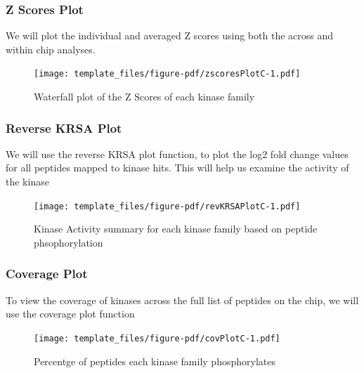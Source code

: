\documentclass[
  letterpaper,
  DIV=11,
  numbers=noendperiod]{scrreport}
\begin{document}
\hypertarget{z-scores-plot-2}{%
\subsubsection{Z Scores Plot}\label{z-scores-plot-2}}

We will plot the individual and averaged Z scores using both the across
and within chip analyses.

\begin{figure}[htbp]

{\centering \texttt{[image: template\_files/figure-pdf/zscoresPlotC-1.pdf]}

}

\caption{Waterfall plot of the Z Scores of each kinase family}

\end{figure}

\hypertarget{reverse-krsa-plot-2}{%
\subsubsection{Reverse KRSA Plot}\label{reverse-krsa-plot-2}}

We will use the reverse KRSA plot function, to plot the log2 fold change
values for all peptides mapped to kinase hits. This will help us examine
the activity of the kinase

\begin{figure}[htbp]

{\centering \texttt{[image: template\_files/figure-pdf/revKRSAPlotC-1.pdf]}

}

\caption{Kinase Activity summary for each kinase family based on peptide
phsophorylation}

\end{figure}

\hypertarget{coverage-plot-2}{%
\subsubsection{Coverage Plot}\label{coverage-plot-2}}

To view the coverage of kinases across the full list of peptides on the
chip, we will use the coverage plot function

\begin{figure}[htbp]

{\centering \texttt{[image: template\_files/figure-pdf/covPlotC-1.pdf]}

}

\caption{Percentge of peptides each kinase family phosphorylates}

\end{figure}
\end{document}
